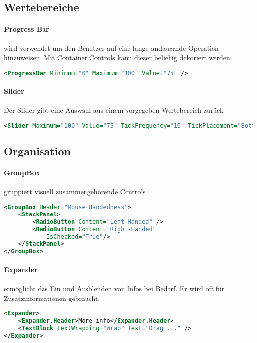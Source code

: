 \subsection{Wertebereiche}
\paragraph{Progress Bar} wird verwendet um den Benutzer auf eine lange andauernde Operation hinzuweisen. Mit Container Controls kann dieser beliebig dekoriert werden. 
\begin{lstlisting}[language=xml]
<ProgressBar Minimum="0" Maximum="100" Value="75" />
\end{lstlisting}
\paragraph{Slider} Der Slider gibt eine Auswahl aus einem vorgegeben Wertebereich zurück
\begin{lstlisting}[language=xml]
<Slider Maximum="100" Value="75" TickFrequency="10" TickPlacement="BottomRight" />
\end{lstlisting}
\subsection{Organisation}
\paragraph{GroupBox} gruppiert visuell zusammengehörende Controls
\begin{lstlisting}[language=xml]
<GroupBox Header="Mouse Handedness">
    <StackPanel>
        <RadioButton Content="Left-Handed" />
        <RadioButton Content="Right-Handed"
            IsChecked="True"/>
    </StackPanel>
</GroupBox>
\end{lstlisting}
\paragraph{Expander} ermöglicht das Ein und Ausblenden von Infos bei Bedarf. Er wird oft für Zusatzinformationen gebraucht.
\begin{lstlisting}[language=xml]
<Expander>
    <Expander.Header>More info</Expander.Header>
    <TextBlock TextWrapping="Wrap" Text="Drag ..." />
</Expander>
\end{lstlisting}
